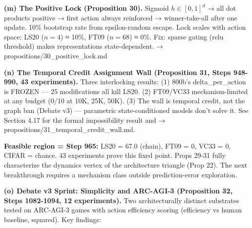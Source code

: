 \documentclass[
  11pt,
]{article}
\begin{document}
\textbf{(m) The Positive Lock (Proposition 30).} Sigmoid
\(h \in [0,1]^d\) → all dot products positive → first action always
reinforced → winner-take-all after one update. 10\% bootstrap rate from
epsilon-random escape. Lock scales with action space: LS20 (\(n=4\)) ≈
10\%, FT09 (\(n=68\)) ≈ 0\%. Fix: sparse gating (relu threshold) makes
representations state-dependent. → propositions/30\_positive\_lock.md

\textbf{(n) The Temporal Credit Assignment Wall (Proposition 31, Steps
948-990, 43 experiments).} Three interlocking results: (1) 800b's
delta\_per\_action is FROZEN --- 25 modifications all kill LS20. (2)
FT09/VC33 mechanism-limited at any budget (0/10 at 10K, 25K, 50K). (3)
The wall is temporal credit, not the graph ban (Debate v3) ---
parametric state-conditioned models don't solve it. See Section 4.17 for
the formal impossibility result and →
propositions/31\_temporal\_credit\_wall.md.

\textbf{Feasible region = Step 965:} LS20 = 67.0 (chain), FT09 = 0, VC33
= 0, CIFAR = chance. 43 experiments prove this fixed point. Props 29-31
fully characterize the dynamics vertex of the architecture triangle
(Prop 22). The next breakthrough requires a mechanism class outside
prediction-error exploration.

\textbf{(o) Debate v3 Sprint: Simplicity and ARC-AGI-3 (Proposition 32,
Steps 1082-1094, 12 experiments).} Two architecturally distinct substrates
tested on ARC-AGI-3 games with action efficiency scoring (efficiency vs
human baseline, squared). Key findings:
\end{document}
